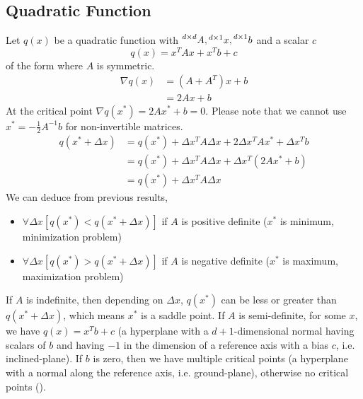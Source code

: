 \documentclass{book}
\numberwithin{equation}{subsection}
\begin{document}
\subsection{Quadratic Function}
Let $q(x)$ be a quadratic function with $\prescript{d \times d}{}{A}, \prescript{d \times 1}{}{x}, \prescript{d \times 1}{}{b}$ and a scalar $c$
\begin{equation}
    q(x) = x^TAx+x^Tb+c
\end{equation}
of the form where $A$ is symmetric.
\begin{align}
    \nabla q(x) &= (A+A^T)x+b\\
     &= 2Ax+b
\end{align}
At the critical point $\nabla q(x^*) = 2Ax^*+b = 0$. Please note that we cannot use $x^* = -\frac{1}{2}A^{-1}b$ for non-invertible matrices.
\begin{align}
    q(x^*+\Delta x) &= q(x^*) + \Delta x^TA\Delta x + 2\Delta x^TAx^* + \Delta x^Tb\\
    &= q(x^*) + \Delta x^TA\Delta x + \Delta x^T(2Ax^* + b)\\
    &= q(x^*) + \Delta x^TA\Delta x
\end{align}
We can deduce from previous results,
\begin{itemize}
    \item $\forall \Delta x [q(x^*) < q(x^*+\Delta x)]$ if $A$ is positive definite ($x^*$ is minimum, minimization problem)
    \item $\forall \Delta x [q(x^*) > q(x^*+\Delta x)]$ if $A$ is negative definite ($x^*$ is maximum, maximization problem)
    \label{posneg}
\end{itemize}
If $A$ is indefinite, then depending on $\Delta x$, $q(x^*)$ can be less or greater than $q(x^*+\Delta x)$, which means $x^*$ is a saddle point. If $A$ is semi-definite, for some $x$, we have $q(x) = x^Tb+c$ (a hyperplane with a $d+1$-dimensional normal having scalars of $b$ and having $-1$ in the dimension of a reference axis with a bias $c$, i.e. inclined-plane). If $b$ is zero, then we have multiple critical points (a hyperplane with a normal along the reference axis, i.e. ground-plane), otherwise no critical points ().
\end{document}
